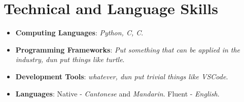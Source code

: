 \section{Technical and Language Skills}
\begin{itemize}
    \item \textbf{Computing Languages}: \emph{Python, C, C\plus{}\plus{}}.
    \item \textbf{Programming Frameworks}: \emph{Put something that can be applied in the industry, dun put things like turtle}.
    \item \textbf{Development Tools}: \emph{whatever, dun put trivial things like VSCode}.
    \item \textbf{Languages}: Native - \emph{Cantonese} and \emph{Mandarin}. Fluent - \emph{English}.
\end{itemize}
